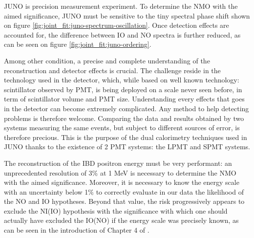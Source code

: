 \documentclass[../main.tex]{subfiles}
\begin{document}
JUNO is precision measurement experiment.
To determine the NMO with the aimed significance, JUNO must be sensitive to the tiny spectral phase shift shown on figure \ref{fig:joint_fit:juno-spectrum-oscillation}.
Once detection effects are accounted for, the difference between IO and NO spectra is further reduced, as can be seen on figure \ref{fig:joint_fit:juno-ordering}.

Among other condition, a precise and complete understanding of the reconstruction and detector effects is crucial.
The challenge reside in the technology used in the detector, which, while based on well known technology: scintillator observed by PMT, is being deployed on a scale never seen before, in term of scintillator volume and  PMT size. Understanding every effects that goes in the detector can become extremely complicated. Any method to help detecting problems is therefore welcome.
Comparing the data and results obtained by two systems measuring the same events, but subject to different sources of error, is therefore precious. This is the purpose of the dual calorimetry techniques used in JUNO thanks to the existence of 2 PMT systems: the LPMT and SPMT systems.

The reconstruction of the IBD positron energy must be very performant: an unprecedented resolution of 3\% at 1 MeV \cite{juno_collaboration_juno_2022} is necessary to determine the NMO with the aimed significance.
Moreover, it is necessary to know the energy scale with an uncertainty below 1\% to correctly evaluate in our data the likelihood of the NO and IO  hypotheses. Beyond that value, the risk progressively appears to exclude the NI(IO) hypothesis with the significance with which  one should actually have excluded the IO(NO) if the energy scale was precisely known, as can be seen in the introduction of Chapter 4 of \cite{han_dual_2021}.
\end{document}
